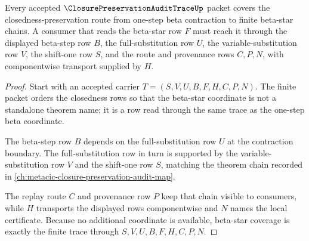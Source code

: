 \begin{theorem}
\label{thm:closure-preservation-audit-trace-beta-star-coverage}
Every accepted $\ClosurePreservationAuditTraceUp$ packet covers the closedness-preservation route from one-step beta contraction to finite beta-star chains. A consumer that reads the beta-star row $F$ must reach it through the displayed beta-step row $B$, the full-substitution row $U$, the variable-substitution row $V$, the shift-one row $S$, and the route and provenance rows $C,P,N$, with componentwise transport supplied by $H$.
\end{theorem}
\begin{proof}
Start with an accepted carrier $T=(S,V,U,B,F,H,C,P,N)$. The finite packet orders the closedness rows so that the beta-star coordinate is not a standalone theorem name; it is a row read through the same trace as the one-step beta coordinate.

The beta-step row $B$ depends on the full-substitution row $U$ at the contraction boundary. The full-substitution row in turn is supported by the variable-substitution row $V$ and the shift-one row $S$, matching the theorem chain recorded in \autoref{ch:metacic-closure-preservation-audit-map}.

The replay route $C$ and provenance row $P$ keep that chain visible to consumers, while $H$ transports the displayed rows componentwise and $N$ names the local certificate. Because no additional coordinate is available, beta-star coverage is exactly the finite trace through $S,V,U,B,F,H,C,P,N$.
\end{proof}


\begin{closurestatus}{\ClosurePreservationAuditTraceUp}
  \theoryclosure{\seedClosure}
  \formalstatus{\unformalizedV}
\end{closurestatus}
